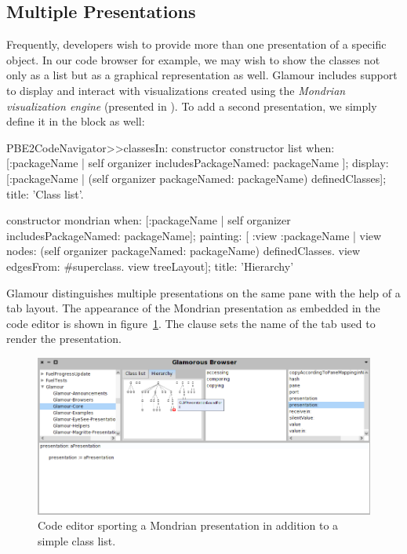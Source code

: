 \documentclass[a4paper,10pt,twoside]{book}
\begin{document}

\subsection{Multiple Presentations}

Frequently, developers wish to provide more than one presentation of a
specific object. In our code browser for example, we may wish to show
the classes not only as a list but as a graphical representation as well. Glamour includes support to display
and interact with visualizations created using the \emph{Mondrian
  visualization engine} (presented in ). To add a second presentation, we simply
define it in the  block as well:

\begin{code}{}
PBE2CodeNavigator>>classesIn: constructor
  constructor list
    when: [:packageName | self organizer includesPackageNamed: packageName ];
    display: [:packageName | (self organizer packageNamed: packageName)
                    definedClasses];
    title: 'Class list'.

  constructor mondrian 
    when: [:packageName | self organizer includesPackageNamed: packageName];
    painting: [ :view :packageName | 
          view nodes: (self organizer packageNamed:  packageName)  
                             definedClasses.
          view edgesFrom:  #superclass.
          view treeLayout];
    title: 'Hierarchy' 
\end{code}

Glamour distinguishes multiple presentations on the same pane with the
help of a tab layout. The appearance of the Mondrian presentation as
embedded in the code editor is shown in
figure~\ref{fig:mondrian-presentation}. The clause  sets
the name of the tab used to render the presentation.

\begin{figure}[htbp]
\centerline{\includegraphics[width=\linewidth]{mondrian-presentation.png}}
\caption{Code editor sporting a Mondrian presentation in addition to a simple class list.}
\label{fig:mondrian-presentation}
\end{figure}
\end{document}
